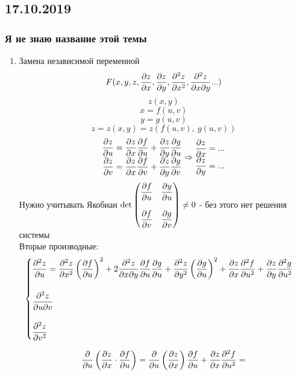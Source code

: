 \documentclass[main]{subfiles}
\begin{document}
  \subsection{17.10.2019}
  \subsubsection{Я не знаю название этой темы}

  \begin{enumerate}
    \item Замена независимой переменной
    \[F(x, y, z, \dfrac{\partial z}{\partial x}, \dfrac{\partial z}{\partial y}, \dfrac{\partial^2 z}{\partial x^2}, \dfrac{\partial^2 z}{\partial x \partial y}...)\]
    \[z(x,y)\]
    \[x = f(u,v)\]
    \[y = g(u,v)\]
    \[z = z(x,y) = z(f(u,v),\ g(u,v))\]
    \[\begin{matrix}
      \dfrac{\partial z}{\partial u} = \dfrac{\partial z}{\partial x} \dfrac{\partial f}{\partial u} + \dfrac{\partial z}{\partial y} \dfrac{\partial g}{\partial u}\\
      \dfrac{\partial z}{\partial v} = \dfrac{\partial z}{\partial x} \dfrac{\partial f}{\partial v} + \dfrac{\partial z}{\partial y} \dfrac{\partial g}{\partial v}
    \end{matrix} \Rightarrow \begin{matrix}
      \dfrac{\partial z}{\partial x} = ...\\
      \dfrac{\partial z}{\partial y} = ...
    \end{matrix}\]
    Нужно учитывать Якобиан $\det \begin{pmatrix}
      \dfrac{\partial f}{\partial u} & \dfrac{\partial y}{\partial u}\\ \\
      \dfrac{\partial f}{\partial v} & \dfrac{\partial g}{\partial v}
    \end{pmatrix} \neq 0$ - без этого нет решения системы\\
    Вторые производные:
    \[\begin{cases}
      \dfrac{\partial^2 z}{\partial u} = \dfrac{\partial^2 z}{\partial x^2} \left(\dfrac{\partial f}{\partial u}\right)^2 + 2 \dfrac{\partial^2 z}{\partial x \partial y} \dfrac{\partial f}{\partial u} \dfrac{\partial g}{\partial u} + \dfrac{\partial^2 z}{\partial y^2} \left(\dfrac{\partial g}{\partial u}\right)^2 + \dfrac{\partial z}{\partial x} \dfrac{\partial^2 f}{\partial u^2} + \dfrac{\partial z}{\partial y} \dfrac{\partial^2 g}{\partial u^2}\\ \\
      \dfrac{\partial^2 z}{\partial u \partial v}\\ \\
      \dfrac{\partial^2 z}{\partial v^2}
    \end{cases}\]
    \begin{Example}
      \[\dfrac{\partial}{\partial u} \left(\dfrac{\partial z}{\partial x} \cdot \dfrac{\partial f}{\partial u}\right) = \dfrac{\partial}{\partial u} \left(\dfrac{\partial z}{\partial x}\right) \dfrac{\partial f}{\partial u} + \dfrac{\partial z}{\partial x} \dfrac{\partial^2 f}{\partial u^2} = \]

\end{Example}
\end{enumerate}
\end{document}
